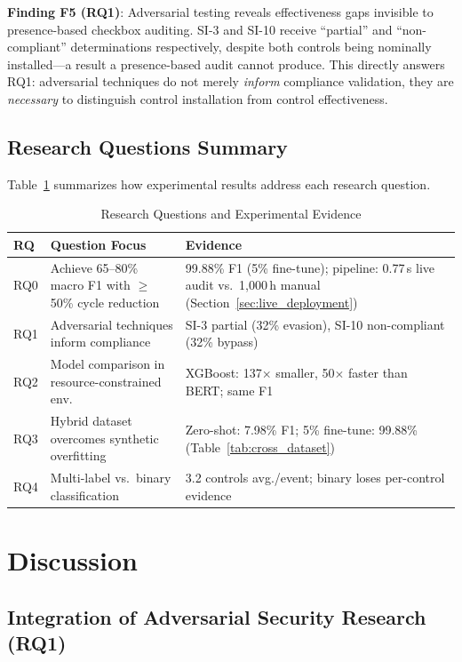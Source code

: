 \documentclass[11pt,conference]{IEEEtran}
\begin{document}
\textbf{Finding F5 (RQ1)}: Adversarial testing reveals effectiveness gaps invisible to presence-based checkbox auditing. SI-3 and SI-10 receive ``partial'' and ``non-compliant'' determinations respectively, despite both controls being nominally installed---a result a presence-based audit cannot produce. This directly answers RQ1: adversarial techniques do not merely \textit{inform} compliance validation, they are \textit{necessary} to distinguish control installation from control effectiveness.

\subsection{Research Questions Summary}

Table~\ref{tab:rq_summary} summarizes how experimental results address each research question.

\begin{table}[!t]
\centering
\caption{Research Questions and Experimental Evidence}
\label{tab:rq_summary}
\begin{tabular}{@{}p{0.6cm}p{3.4cm}p{3.2cm}@{}}
\toprule
\textbf{RQ} & \textbf{Question Focus} & \textbf{Evidence} \\
\midrule
RQ0 & Achieve 65--80\% macro F1 with $\geq$50\% cycle reduction & 99.88\% F1 (5\% fine-tune); pipeline: 0.77\,s live audit vs.\ 1,000\,h manual (Section~\ref{sec:live_deployment}) \\
RQ1 & Adversarial techniques inform compliance & SI-3 partial (32\% evasion), SI-10 non-compliant (32\% bypass) \\
RQ2 & Model comparison in resource-constrained env. & XGBoost: 137$\times$ smaller, 50$\times$ faster than BERT; same F1 \\
RQ3 & Hybrid dataset overcomes synthetic overfitting & Zero-shot: 7.98\% F1; 5\% fine-tune: 99.88\% (Table~\ref{tab:cross_dataset}) \\
RQ4 & Multi-label vs.\ binary classification & 3.2 controls avg./event; binary loses per-control evidence \\
\bottomrule
\end{tabular}
\end{table}

\section{Discussion}

\subsection{Integration of Adversarial Security Research (RQ1)}
\end{document}
